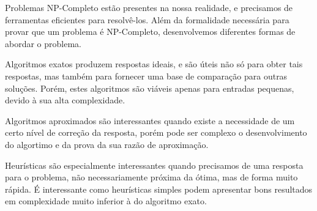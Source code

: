 \documentclass{article}
\begin{document}
Problemas NP-Completo estão presentes na nossa realidade, e precisamos de ferramentas eficientes para resolvê-los. Além da formalidade necessária para provar que um problema é NP-Completo, desenvolvemos diferentes formas de abordar o problema.

Algoritmos exatos produzem respostas ideais, e são úteis não só para obter tais respostas, mas também para fornecer uma base de comparação para outras soluções. Porém, estes algoritmos são viáveis apenas para entradas pequenas, devido à sua alta complexidade.

Algoritmos aproximados são interessantes quando existe a necessidade de um certo nível de correção da resposta, porém pode ser complexo o desenvolvimento do algortimo e da prova da sua razão de aproximação.

Heurísticas são especialmente interessantes quando precisamos de uma resposta para o problema, não necessariamente próxima da ótima, mas de forma muito rápida. É interessante como heurísticas simples podem apresentar bons resultados em complexidade muito inferior à do algoritmo exato.


\pagebreak



\end{document}
